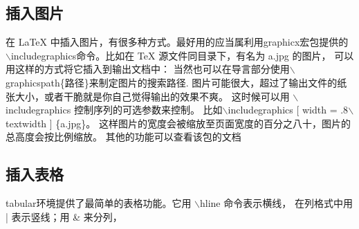 \documentclass{thesis}
\begin{document}
\subsection{插入图片}
在 LaTeX 中插入图片，有很多种方式。最好用的应当属利用graphicx宏包提供的
$\backslash$includegraphics命令。比如在 TeX 源文件同目录下，有名为 a.jpg 的图片，
可以用这样的方式将它插入到输出文档中：
当然也可以在导言部分使用$\backslash$graphicspath\{路径\}来制定图片的搜索路径.
图片可能很大，超过了输出文件的纸张大小，或者干脆就是你自己觉得输出的效果不爽。
这时候可以用 $\backslash$includegraphics 控制序列的可选参数来控制。
比如$\backslash$includegraphics [ width = .8$\backslash$ textwidth ] \{a.jpg\}。
这样图片的宽度会被缩放至页面宽度的百分之八十，图片的总高度会按比例缩放。
其他的功能可以查看该包的文档\\
\subsection{插入表格}
tabular环境提供了最简单的表格功能。它用 $\backslash$hline 命令表示横线，
在列格式中用 | 表示竖线；用 \& 来分列，
\end{document}
